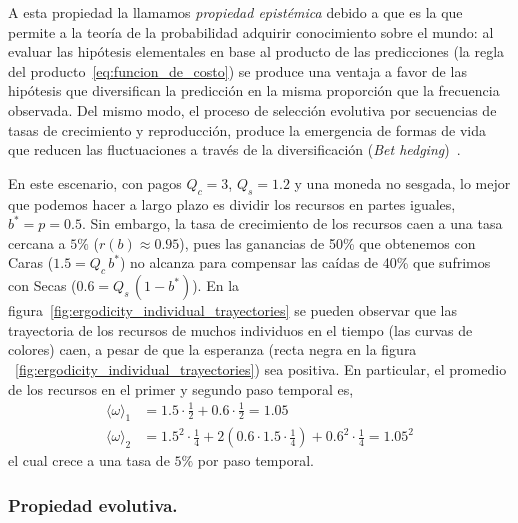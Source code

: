 \documentclass[a4paper,11pt]{book}
\theoremstyle{definition}
\begin{document}

A esta propiedad la llamamos \emph{propiedad epist\'emica} debido a que es la que permite a la teor\'ia de la probabilidad adquirir conocimiento sobre el mundo: al evaluar las hip\'otesis elementales en base al producto de las predicciones (la regla del producto~\ref{eq:funcion_de_costo}) se produce una ventaja a favor de las hip\'otesis que diversifican la predicci\'on en la misma proporci\'on que la frecuencia observada.
%
Del mismo modo, el proceso de selecci\'on evolutiva por secuencias de tasas de crecimiento y reproducci\'on, produce la emergencia de formas de vida que reducen las fluctuaciones a trav\'es de la diversificaci\'on (\emph{Bet hedging})~\cite{starrfelt2012-bet}.


En este escenario, con pagos $Q_c=3$, $Q_s=1.2$ y una moneda no sesgada, lo mejor que podemos hacer a largo plazo es dividir los recursos en partes iguales, $b^* = p = 0.5$.
%
Sin embargo, la tasa de crecimiento de los recursos caen a una tasa cercana a $5\%$ ($r(b) \approx 0.95$), pues las ganancias de 50\% que obtenemos con Caras ($1.5 = Q_c \, b^*$) no alcanza para compensar las ca\'idas de 40\% que sufrimos con Secas ($0.6 = Q_s \, (1-b^*)$).
%
En la figura~\ref{fig:ergodicity_individual_trayectories} se pueden observar que las trayectoria de los recursos de muchos individuos en el tiempo (las curvas de colores) caen, a pesar de que la esperanza (recta negra en la figura ~\ref{fig:ergodicity_individual_trayectories}) sea positiva.
%
En particular, el promedio de los recursos en el primer y segundo paso temporal es,
%
\begin{equation}
\begin{split}
\langle \omega \rangle_1 & = 1.5 \cdot \frac{1}{2} + 0.6 \cdot  \frac{1}{2} = 1.05 \\
\langle \omega \rangle_2 &=  1.5^2 \cdot \frac{1}{4} + 2 (0.6 \cdot 1.5 \cdot \frac{1}{4} ) + 0.6^2 \cdot \frac{1}{4}= 1.05^2
\end{split}
\end{equation}
%
el cual crece a una tasa de $5\%$ por paso temporal.


\subsubsection{Propiedad evolutiva.} \label{sec:propiedad_evolutiva}
\end{document}
